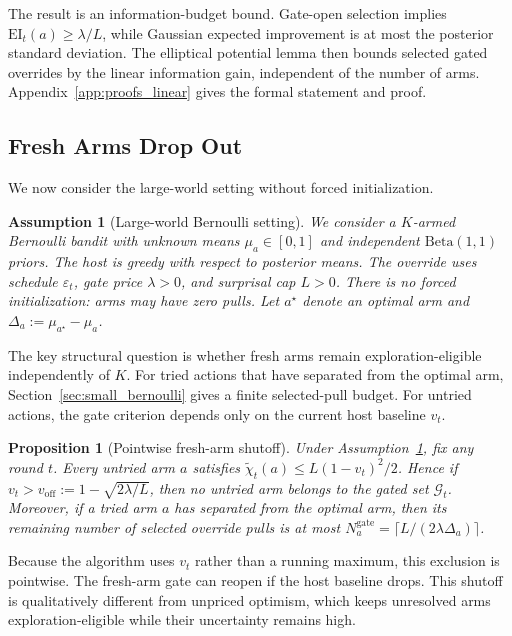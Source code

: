 \documentclass{article}
\newtheorem{proposition} {Proposition}
\newtheorem{assumption} {Assumption}
\newcommand{\Gc}{\mathcal{G}}
\newcommand{\delight}{\chi} %
\newcommand{\EI}{\mathrm{EI}} %
\begin{document}
The result is an information-budget bound.
Gate-open selection implies $\EI_t(a)\ge\lambda/L$, while Gaussian expected improvement is at most the posterior standard deviation.
The elliptical potential lemma then bounds selected gated overrides by the linear information gain, independent of the number of arms.
Appendix~\ref{app:proofs_linear} gives the formal statement and proof.


\subsection{Fresh Arms Drop Out}
\label{sec:fresharms}

We now consider the large-world setting without forced initialization.

\begin{assumption}[Large-world Bernoulli setting]
\label{assump:large}
We consider a $K$-armed Bernoulli bandit with unknown means $\mu_a \in [0,1]$ and independent $\mathrm{Beta}(1,1)$ priors.
The host is greedy with respect to posterior means.
The override uses schedule $\varepsilon_t$, gate price $\lambda > 0$, and surprisal cap $L > 0$.
There is no forced initialization: arms may have zero pulls.
Let $a^\star$ denote an optimal arm and $\Delta_a := \mu_{a^\star} - \mu_a$.
\end{assumption}

The key structural question is whether fresh arms remain exploration-eligible independently of $K$.
For tried actions that have separated from the optimal arm, Section~\ref{sec:small_bernoulli} gives a finite selected-pull budget.
For untried actions, the gate criterion depends only on the current host baseline $v_t$.

\begin{proposition}[Pointwise fresh-arm shutoff]
\label{prop:budget}
Under Assumption~\ref{assump:large}, fix any round $t$.
Every untried arm $a$ satisfies
$\tilde{\delight}_t(a) \le L(1-v_t)^2/2$.
Hence if $v_t > v_{\mathrm{off}} := 1 - \sqrt{2\lambda/L}$, then no untried arm belongs to the gated set $\Gc_t$.
Moreover, if a tried arm $a$ has separated from the optimal arm, then its remaining number of selected override pulls is at most
$N_a^{\mathrm{gate}} = \lceil L/(2\lambda\Delta_a) \rceil$.
\end{proposition}

Because the algorithm uses $v_t$ rather than a running maximum, this exclusion is pointwise.
The fresh-arm gate can reopen if the host baseline drops.
This shutoff is qualitatively different from unpriced optimism, which keeps unresolved arms exploration-eligible while their uncertainty remains high.
\end{document}
